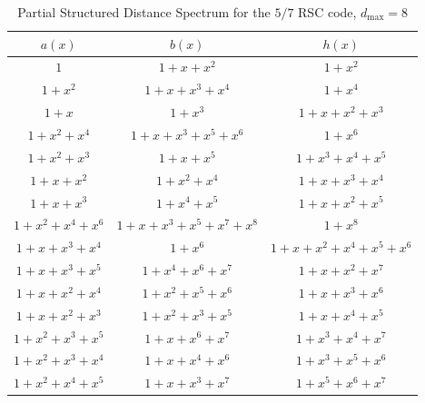 \begin{table*}[h]
 \caption{Partial Structured Distance Spectrum for the $5/7$ RSC code, $d_{\text{max}}=8$}
\centering
 \begin{tabular}{c c c} 
 \hline
 $a(x)$ & $b(x)$ & $h(x)$ \\ [0.5ex] 
 \hline\hline
$1$ & $1+x+x^{2}$ & $1+x^2$\\
\hline
$1+x^2$ & $1+x+x^3+x^4$ & $1+x^{4}$\\
\hline
$1+x$ & $1+x^3$ & $1+x+x^2+x^3$\\
\hline
$1+x^2+x^4$ & $1+x+x^3+x^5+x^6$ & $1+x^{6}$\\
\hline
$1+x^2+x^3$ & $1+x+x^5$ & $1+x^3+x^4+x^5$\\
\hline
$1+x+x^2$ & $1+x^2+x^4$ & $1+x+x^3+x^4$\\
\hline
$1+x+x^3$ & $1+x^4+x^5$ & $1+x+x^2+x^5$\\
\hline
$1+x^2+x^4+x^6$ & $1+x+x^3+x^5+x^7+x^8$ & $1+x^8$\\
\hline
$1+x+x^3+x^4$ & $1+x^6$ & $1+x+x^2+x^4+x^5+x^6$\\
\hline
$1+x+x^3+x^5$ & $1+x^4+x^6+x^7$ & $1+x+x^2+x^7$\\
\hline
$1+x+x^2+x^4$ & $1+x^2+x^5+x^6$ & $1+x+x^3+x^6$\\
\hline
$1+x+x^2+x^3$ & $1+x^2+x^3+x^5$ & $1+x+x^4+x^5$\\
\hline
$1+x^2+x^3+x^5$ & $1+x+x^6+x^7$ & $1+x^3+x^4+x^7$\\
\hline
$1+x^2+x^3+x^4$ & $1+x+x^4+x^6$ & $1+x^3+x^5+x^6$\\
\hline
$1+x^2+x^4+x^5$ & $1+x+x^3+x^7$ & $1+x^5+x^6+x^7$\\
 \end{tabular}
 
 \label{novelTab13}
\end{table*}

